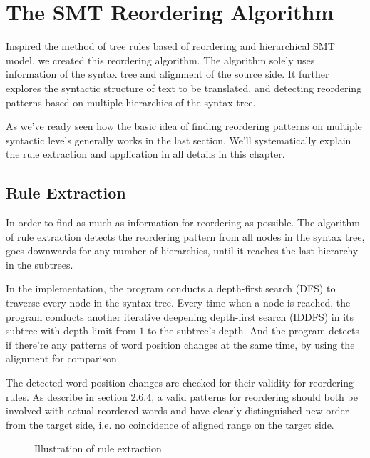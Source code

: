 \section{The SMT Reordering Algorithm}
\label{ch:ReorderingApproach:sec:Algorithm}

Inspired the method of tree rules based of reordering and hierarchical SMT model, we created this reordering algorithm. The algorithm solely uses information of the syntax tree and alignment of the source side. It further explores the syntactic structure of text to be translated, and detecting reordering patterns based on multiple hierarchies of the syntax tree.

As we've ready seen how the basic idea of finding reordering patterns on multiple syntactic levels generally works in the last section. We'll systematically explain the rule extraction and application in all details in this chapter.

\subsection{Rule Extraction}

In order to find as much as information for reordering as possible. The algorithm of rule extraction detects the reordering pattern from all nodes in the syntax tree, goes downwards for any number of hierarchies, until it reaches the last hierarchy in the subtrees.

In the implementation, the program conducts a depth-first search (DFS) to traverse every node in the syntax tree. Every time when a node is reached, the program conducts another iterative deepening depth-first search (IDDFS) in its subtree with depth-limit from $1$ to the subtree's depth. And the program detects if there're any patterns of word position changes at the same time, by using the alignment for comparison.

The detected word position changes are checked for their validity for reordering rules. As describe in \hyperref[general]{section $2.6.4$}, a valid patterns for reordering should both be involved with actual reordered words and have clearly distinguished new order from the target side, i.e. no coincidence of aligned range on the target side.

\begin{figure}[H]
\centering

\caption{Illustration of rule extraction}
\end{figure}

